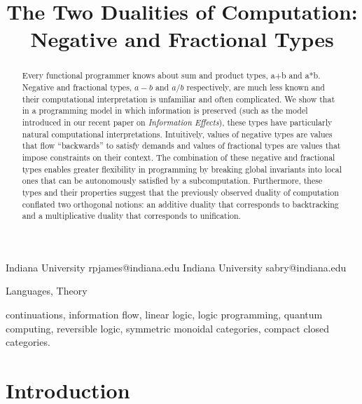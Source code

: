 \documentclass[preprint]{sigplanconf}
\begin{document}
\CopyrightYear{}
\copyrightdata{}
\titlebanner{}
\preprintfooter{}

\title{The Two Dualities of Computation: Negative and Fractional Types}
           {Indiana University}
           {rpjames@indiana.edu}
           {Indiana University}
           {sabry@indiana.edu}
\maketitle

\begin{abstract}
  Every functional programmer knows about sum and product types, {{a+b}} and
  {{a*b}}. Negative and fractional types, $a-b$ and $a/b$ respectively, are
  much less known and their computational interpretation is unfamiliar and
  often complicated. We show that in a programming model in which information
  is preserved (such as the model introduced in our recent paper on
  \emph{Information Effects}), these types have particularly natural
  computational interpretations. Intuitively, values of negative types are
  values that flow ``backwards'' to satisfy demands and values of fractional
  types are values that impose constraints on their context.  The combination
  of these negative and fractional types enables greater flexibility in
  programming by breaking global invariants into local ones that can be
  autonomously satisfied by a subcomputation. Furthermore, these types and
  their properties suggest that the previously observed duality of
  computation conflated two orthogonal notions: an additive duality that
  corresponds to backtracking and a multiplicative duality that corresponds
  to unification.
\end{abstract}


\terms
Languages, Theory

\keywords continuations, information flow, linear logic, logic programming,
quantum computing, reversible logic, symmetric monoidal categories, compact
closed categories.

\section{Introduction}
\end{document}

